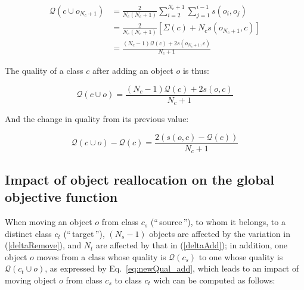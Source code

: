 \documentclass[10pt,letterpaper]{article}
\newcommand{\gl}[1]{``\,#1\,''} %
\begin{document}
\begin{equation*}
  \begin{aligned}
    \mathcal{Q}(c \cup o_{N_c+1}) & = \frac{2}{N_c(N_c+1)} \sum_{i=2}^{N_c+1} \sum_{j=1}^{i-1} s\left(o_i, o_j\right) \\
                                & = \frac{2}{N_c(N_c+1)} \left[\Sigma(c) + N_c s\left(o_{N_c+1}, c\right)\right] \\
                                & = \frac{(N_c-1) \mathcal{Q}(c)  + 2s\left(o_{N_c+1}, c\right)}{N_c+1}
  \end{aligned}
\end{equation*}

\noindent The quality of a class $c$ after adding an object $o$ is thus:

\begin{equation}
  \mathcal{Q}\left(c \cup o\right) = \frac{(N_c-1) \mathcal{Q}(c)  + 2s\left(o, c\right)}{N_c+1}
  \label{eq:newQual_add}
\end{equation}

\noindent And the change in quality from its previous value:

\begin{equation} \label{deltaAdd}
    \mathcal{Q}\left(c \cup o\right) - \mathcal{Q}\left(c\right)  = \frac{2\left(s\left(o, c\right)-\mathcal{Q}(c)\right)}{N_c+1}
\end{equation}


\subsection{Impact of object reallocation on the global objective function}
\label{sec:delta_definition}

When moving an object $o$ from class $c_s$ (\gl{source}), to whom it belongs, to a
distinct class $c_t$ (\gl{target}), $(N_s-1)$ objects are affected
by the variation in (\ref{deltaRemove}), and $N_t$ are affected
by that in (\ref{deltaAdd}); in addition, one object $o$ moves from a class whose quality is $\mathcal{Q}(c_s)$ to one whose quality is $\mathcal{Q}\left(c_t \cup o\right)$, as expressed by Eq.~\ref{eq:newQual_add}, which leads to an impact of moving object $o$ from class $c_s$ to class $c_t$ wich can be computed as follows:
\end{document}
